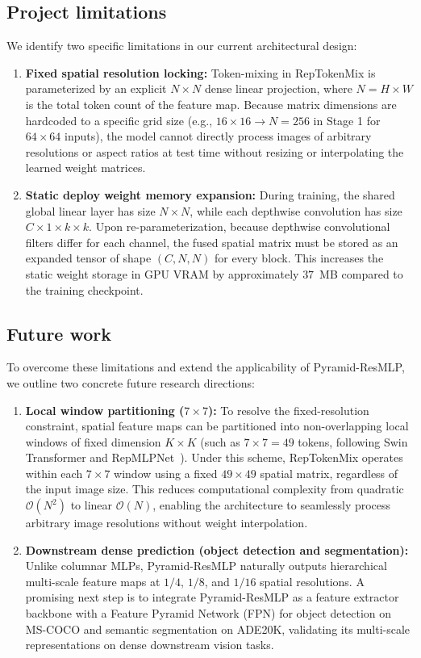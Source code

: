 \subsection{Project limitations}
\label{subsection:limitations}
We identify two specific limitations in our current architectural design:
\begin{enumerate}
    \item \textbf{Fixed spatial resolution locking:} Token-mixing in RepTokenMix is parameterized by an explicit $N \times N$ dense linear projection, where $N = H \times W$ is the total token count of the feature map. Because matrix dimensions are hardcoded to a specific grid size (e.g., $16 \times 16 \to N=256$ in Stage 1 for $64 \times 64$ inputs), the model cannot directly process images of arbitrary resolutions or aspect ratios at test time without resizing or interpolating the learned weight matrices.
    \item \textbf{Static deploy weight memory expansion:} During training, the shared global linear layer has size $N \times N$, while each depthwise convolution has size $C \times 1 \times k \times k$. Upon re-parameterization, because depthwise convolutional filters differ for each channel, the fused spatial matrix must be stored as an expanded tensor of shape $(C, N, N)$ for every block. This increases the static weight storage in GPU VRAM by approximately $37$~MB compared to the training checkpoint.
\end{enumerate}

\subsection{Future work}
\label{subsection:future_work}
To overcome these limitations and extend the applicability of Pyramid-ResMLP, we outline two concrete future research directions:
\begin{enumerate}
    \item \textbf{Local window partitioning ($7 \times 7$):} To resolve the fixed-resolution constraint, spatial feature maps can be partitioned into non-overlapping local windows of fixed dimension $K \times K$ (such as $7 \times 7 = 49$ tokens, following Swin Transformer and RepMLPNet~\cite{ding2022repmlp}). Under this scheme, RepTokenMix operates within each $7 \times 7$ window using a fixed $49 \times 49$ spatial matrix, regardless of the input image size. This reduces computational complexity from quadratic $\mathcal{O}(N^2)$ to linear $\mathcal{O}(N)$, enabling the architecture to seamlessly process arbitrary image resolutions without weight interpolation.
    \item \textbf{Downstream dense prediction (object detection and segmentation):} Unlike columnar MLPs, Pyramid-ResMLP naturally outputs hierarchical multi-scale feature maps at $1/4$, $1/8$, and $1/16$ spatial resolutions. A promising next step is to integrate Pyramid-ResMLP as a feature extractor backbone with a Feature Pyramid Network (FPN) for object detection on MS-COCO and semantic segmentation on ADE20K, validating its multi-scale representations on dense downstream vision tasks.
\end{enumerate}
